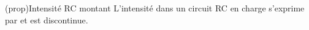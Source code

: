 \documentclass[../../main/main.tex]{subfiles}
\begin{document}
\begin{tcb*}[label=prop:irc-charge, sidebyside, righthand ratio=.3]
  (prop){Intensité RC montant}
	L'intensité dans un circuit RC en charge s'exprime par
	\psw{%
		\[
			\boxed{i(t) = \frac{E}{R}\exp \left(-\frac{t}{\tau} \right)}
		\]
	}%
  et est discontinue.
	\tcblower
	\begin{center}
	\end{center}
\end{tcb*}
\end{document}
